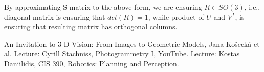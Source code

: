 \documentclass[a4paper]{article}
\begin{document}
By approximating S matrix to the above form, we are ensuring $R \in SO(3)$, i.e., diagonal matrix is ensuring that $det(R) = 1$, while product of $U$ and $V^{T}$, is ensuring that resulting matrix has orthogonal columns.  

\begin{thebibliography}{9}
     An Invitation to 3-D Vision: From Images to Geometric Models, Jana Košecká et al.
     Lecture: Cyrill Stachniss, Photogrammetry I, YouTube.
     Lecture: Kostas Daniilidis, CIS 390, Robotics: Planning and Perception.
\end{thebibliography}
\end{document}
